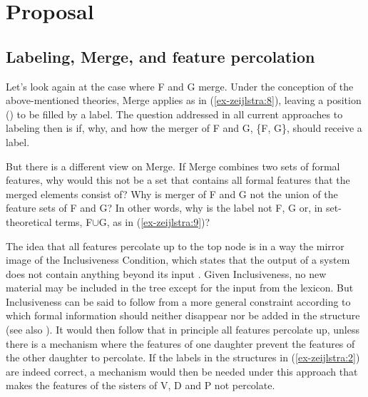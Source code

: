 \documentclass[output=paper
,modfonts
,nonflat]{langsci/langscibook}
\begin{document}
\section{Proposal}
\subsection{Labeling, Merge, and feature percolation}
Let’s look again at the case where F and G merge. Under the conception of the above-mentioned theories, Merge applies as in (\ref{ex-zeijlstra:8}), leaving a position (\ul{}) to be filled by a label. The question addressed in all current approaches to labeling then is if, why, and how the merger of F and G, \{F, G\}, should receive a label.

\begin{figure}
	\begin{exe}
		\exbox{ \label{ex-zeijlstra:8}
		\begin{forest}	
			[\ul{}
			[F]
			[G] ]
		\end{forest}}
	\end{exe} \vspace{-0.8cm}
\end{figure}
\noindent But there is a different view on Merge. If Merge combines two sets of formal features, why would this not be a set that contains all formal features that the merged elements consist of? Why is merger of F and G not the union of the feature sets of F and G? In other words, why is the label not F, G or, in set-theoretical terms, F$\cup$G, as in (\ref{ex-zeijlstra:9})?

\begin{figure} 
	\begin{exe}	
\exbox{ \label{ex-zeijlstra:9}
		\begin{forest}	
			[F$\cup$G
			[F]
			[G] ]
		\end{forest}}
	\end{exe} \vspace{-0.8cm}
\end{figure}
\noindent The idea that all features percolate up to the top node is in a way the mirror image of the Inclusiveness Condition, which states that the output of a system does not contain anything beyond its input \citep[225]{Chomsky1995}. Given Inclusiveness, no new material may be included in the tree except for the input from the lexicon. But Inclusiveness can be said to follow from a more general constraint according to which formal information should neither disappear nor be added in the structure (see also \citealt{Neeleman_VanDerKoot2002}). It would then follow that in principle all features percolate up, unless there is a mechanism where the features of one daughter prevent the features of the other daughter to percolate. If the labels in the structures in (\ref{ex-zeijlstra:2}) are indeed correct, a mechanism would then be needed under this approach that makes the features of the sisters of V, D and P not percolate. 
\end{document}

